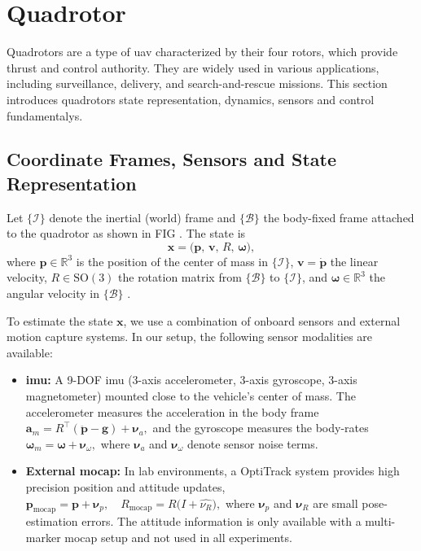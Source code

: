 \section{Quadrotor}
\label{sec:quadrotor_control}
Quadrotors are a type of \gls{uav} characterized by their four rotors, which provide thrust and control authority. They are widely used in various applications, including surveillance, delivery, and search-and-rescue missions.
This section introduces  quadrotors state representation, dynamics, sensors and control fundamentalys. 

\subsection{Coordinate Frames, Sensors and State Representation}
Let $\{\mathcal I\}$ denote the inertial (world) frame and $\{\mathcal B\}$ the body-fixed frame attached to the quadrotor as shown in FIG . The state is
\[
\bm x = \bigl(\bm p,\,\bm v,\,R,\,\bm \omega\bigr),
\]
where $\bm p\in\mathbb R^3$ is the position of the center of mass in $\{\mathcal I\}$, $\bm v = \dot{\bm p}$ the linear velocity, $R\in \mathrm{SO}(3)$ the rotation matrix from $\{\mathcal B\}$ to $\{\mathcal I\}$, and $\bm\omega\in\mathbb R^3$ the angular velocity in $\{\mathcal B\}$ .

To estimate the state $\bm x$, we use a combination of onboard sensors and external motion capture systems. In our setup, the following sensor modalities are available:

\begin{itemize}
  \item \textbf{\gls{imu}:} A 9-DOF \gls{imu} (3-axis accelerometer, 3-axis gyroscope, 3-axis magnetometer) mounted close to the vehicle's center of mass. The accelerometer measures the acceleration in the body frame
    \(
      \bm a_m = R^\top (\ddot{\bm p} - \bm g) + \bm \nu_a,
    \)
    and the gyroscope measures the body-rates
    \(
      \bm \omega_m = \bm \omega + \bm \nu_\omega,
    \)
    where $\bm \nu_a$ and $\bm \nu_\omega$ denote sensor noise terms.
 
  \item \textbf{External \gls{mocap}:} In lab environments, a OptiTrack system provides high precision position and attitude updates,
    \(
      \bm p_{\text{mocap}} = \bm p + \bm \nu_p,\quad
      R_{\mathrm{mocap}} = R \bigl(I + \widehat{\nu_R}\bigr),
    \)
    where $\bm \nu_p$ and $\bm \nu_R$ are small pose-estimation errors. The attitude information is only available with a multi-marker mocap setup and not used in all experiments.
\end{itemize}

